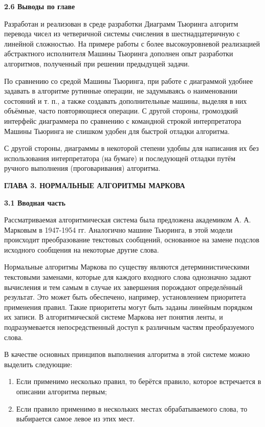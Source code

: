 \documentclass{article}
\begin{document}
\par \textbf{2.6 Выводы по главе}\\
\par Разработан и реализован в среде разработки Диаграмм Тьюринга алгоритм перевода чисел из четверичной системы счисления в шестнадцатеричную с линейной сложностью. На примере работы с более высокоуровневой реализацией абстрактного исполнителя Машины Тьюринга дополнен опыт разработки алгоритмов, полученный при решении предыдущей задачи.\\

\par По сравнению со средой Машины Тьюринга, при работе с диаграммой удобнее задавать в алгоритме рутинные операции, не задумываясь о наименовании состояний и т. п., а также создавать дополнительные машины, выделяя в них объёмные, часто повторяющиеся операции. С другой стороны, громоздкий интерфейс диаграммера по сравнению с командной строкой интерпретатора Машины Тьюринга не слишком удобен для быстрой отладки алгоритма.\\

\par С другой стороны, диаграммы в некоторой степени удобны для написания их без использования интерпретатора (на бумаге) и последующей отладки путём ручного выполнения (проговаривания) алгоритма.\\

\vspace{0.5cm}


\begin{center}
    \textbf{ГЛАВА 3. НОРМАЛЬНЫЕ АЛГОРИТМЫ МАРКОВА}
\end{center}

\par \textbf{3.1 Вводная часть}\\
\par Рассматриваемая алгоритмическая система была предложена академиком А. А. Марковым в 1947-1954 гг. Аналогично машине Тьюринга, в этой модели происходит преобразование текстовых сообщений, основанное на замене подслов исходного сообщения на некоторые другие слова.\\
\par Нормальные алгоритмы Маркова по существу являются детерминистическими текстовыми заменами, которые для каждого входного слова однозначно задают вычисления и тем самым в случае их завершения порождают определённый результат. Это может быть обеспечено, например, установлением приоритета применения правил. Такие приоритеты могут быть заданы линейным порядком их записи. В алгоритмической системе Маркова нет понятия ленты, и подразумевается непосредственный доступ к различным частям преобразуемого слова.\\
\par В качестве основных принципов выполнения алгоритма в этой системе можно выделить следующие:
\begin{enumerate}
    \item Если применимо несколько правил, то берётся правило, которое встречается в описании алгоритма первым;
    \item Если правило применимо в нескольких местах обрабатываемого слова, то выбирается самое левое из этих мест.
\end{enumerate}
\end{document}
